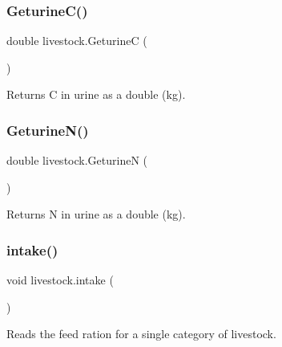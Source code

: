 \mbox{\label{classlivestock_a9f65c516bc1d05f80486bf8086fa6d57}} 
\subsubsection{\texorpdfstring{GeturineC()}{GeturineC()}}
{\footnotesize\ttfamily double livestock.\+GeturineC (\begin{DoxyParamCaption}{ }\end{DoxyParamCaption})\hspace{0.3cm}{\ttfamily [inline]}}



Returns C in urine as a double (kg). 

\mbox{\label{classlivestock_a093a6fa94cb68cbc9c2c5f9ba9310a1c}} 
\subsubsection{\texorpdfstring{GeturineN()}{GeturineN()}}
{\footnotesize\ttfamily double livestock.\+GeturineN (\begin{DoxyParamCaption}{ }\end{DoxyParamCaption})\hspace{0.3cm}{\ttfamily [inline]}}



Returns N in urine as a double (kg). 

\mbox{\label{classlivestock_ad338831b82101e04caa927a1e3c77d0b}} 
\subsubsection{\texorpdfstring{intake()}{intake()}}
{\footnotesize\ttfamily void livestock.\+intake (\begin{DoxyParamCaption}{ }\end{DoxyParamCaption})\hspace{0.3cm}{\ttfamily [inline]}}



Reads the feed ration for a single category of livestock. 

